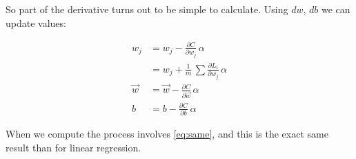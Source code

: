 So part of the derivative turns out to be simple to calculate. Using $dw$, $db$ we can update values:

\begin{align}
  w_j &= w_j - \frac{\partial C}{\partial w_j}\,\alpha\\
  &= w_j + \frac{1}{m}\,\sum \frac{\partial L_i}{\partial w_j}\,\alpha\label{eq:same}\\
  \vec{w} &= \vec{w} - \frac{\partial C}{\partial \vec{w}}\,\alpha\\
  b &= b - \frac{\partial C}{\partial b}\,\alpha
\end{align}

When we compute the process involves \ref{eq:same}, and this is the exact same result than for linear regression. 
